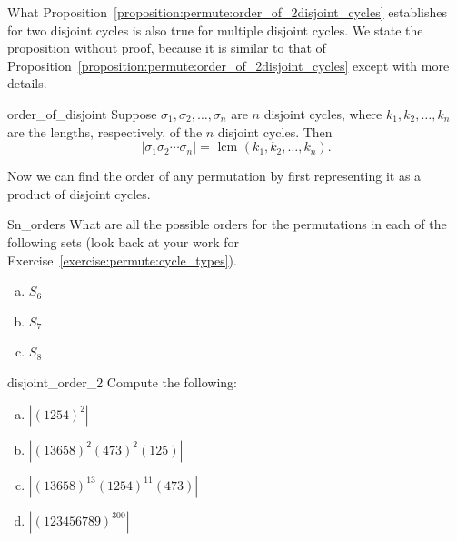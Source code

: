 What Proposition~\ref{proposition:permute:order_of_2disjoint_cycles} establishes for two disjoint cycles is also true for multiple disjoint cycles. We state the proposition without proof, because it is similar to that of Proposition~\ref{proposition:permute:order_of_2disjoint_cycles} except with more details.

\begin{prop}{order_of_disjoint}
Suppose $\sigma_1, \sigma_2, \ldots , \sigma_n$ are $n$ disjoint cycles, where $k_1, k_2, \ldots, k_n$ are the lengths, respectively, of the $n$ disjoint cycles.  Then 
\[
|\sigma_1 \sigma_2  \cdots \sigma_n| = \mbox{ lcm }(k_1, k_2, \ldots, k_n). \]
\end{prop}

\noindent
Now we can find the order of any permutation by first representing it as a product of disjoint cycles.

\begin{exercise}{Sn_orders}
What are all the possible orders for the permutations in each of the following sets (look back at your work for Exercise~\ref{exercise:permute:cycle_types}).
\begin{multicols}{3}
\begin{enumerate}[(a)]
\item
$S_6$
\item
$S_7$
\item
$S_8$
\end{enumerate}
\end{multicols}
\end{exercise}

\begin{exercise}{disjoint_order_2}
Compute the following:
\begin{multicols}{2}
\begin{enumerate}[(a)]
\item
$| (1 2 5 4)^2 |$ 
\item
$| (1 3 6 5 8)^2 (4 7 3)^2 (1 2 5) |$
\item
$| (1 3 6 5 8)^{13} (1 2 5 4)^{11} (4 7 3) |$
\item
$| (1 2  3 4 5 6 7 8 9)^{300} |$
\end{enumerate}
\end{multicols}
\end{exercise}



